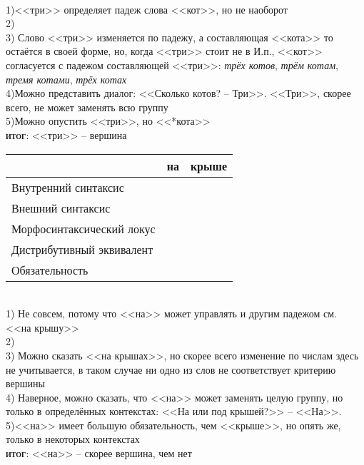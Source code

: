 \documentclass[14pt,extrafontsizes]{article}
\begin{document}
\\
1)<<три>> определяет падеж слова <<кот>>, но не наоборот\\
2) \\
3) Слово <<три>> изменяется по падежу, а составляющая <<кота>> то остаётся в своей форме, но, когда <<три>> стоит не в И.п., <<кот>> согласуется с падежом составляющей <<три>>: \textit{трёх котов}, \textit{трём котам}, \textit{тремя котами}, \textit{трёх котах}\\
4)Можно представить диалог: <<Сколько котов? -- Три>>. <<Три>>, скорее всего, не может заменять всю группу\\
5)Можно опустить <<три>>, но <<*кота>>\\
\textsc{\textbf{итог}}: <<три>> -- вершина\\
    \begin{tabular}{|l|c|c|}
        \hline
         & \textbf{на} & \textbf{крыше}\\
         \hline
         Внутренний синтаксис& \cellcolor{yellow} & \cellcolor{red}\\
         Внешний синтаксис& \cellcolor{yellow} & \cellcolor{red}\\
         Морфосинтаксический локус& \cellcolor{red} & \cellcolor{red}\\
         Дистрибутивный эквивалент& \cellcolor{yellow} & \cellcolor{red}\\
         Обязательность& \cellcolor{yellow} & \cellcolor{red}\\
         \hline
    \end{tabular}\\
1) Не совсем, потому что <<на>> может управлять и другим падежом см. <<на крышу>>\\
2)\\
3) Можно сказать <<на крышах>>, но скорее всего изменение по числам здесь не учитывается, в таком случае ни одно из слов не соответствует критерию вершины\\
4) Наверное, можно сказать, что <<на>> может заменять целую группу, но только в определённых контекстах: <<На или под крышей?>> -- <<На>>.\\
5)<<на>> имеет большую обязательность, чем <<крыше>>, но опять же, только в некоторых контекстах\\
\textsc{\textbf{итог}}: <<на>> -- скорее вершина, чем нет
\end{document}

